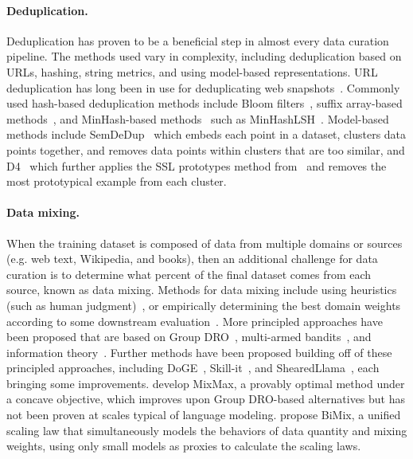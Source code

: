 \documentclass{article}
\begin{document}
\paragraph{Deduplication.}
Deduplication has proven to be a beneficial step in almost every data curation pipeline. The methods used vary in complexity, including deduplication based on URLs, hashing, string metrics, and using model-based representations. URL deduplication has long been in use for deduplicating web snapshots~\citep{10.1145/1645953.1646283}. Commonly used hash-based deduplication methods include Bloom filters~\citep{10.1145/362686.362692, soldaini2024dolma}, suffix array-based methods~\citep{Lee2021DeduplicatingTD, refinedweb}, and MinHash-based methods~\citep{666900} such as MinHashLSH~\citep{gpt3}. Model-based methods include SemDeDup~\citep{abbas2023semdedup} which embeds each point in a dataset, clusters data points together, and removes data points within clusters that are too similar, and D4~\citep{tirumala2024d4} which further applies the SSL prototypes method from~\citet{sorscher2022beyond} and removes the most prototypical example from each cluster.

\paragraph{Data mixing.}
When the training dataset is composed of data from multiple domains or sources (e.g. web text, Wikipedia, and books), then an additional challenge for data curation is to determine what percent of the final dataset comes from each source, known as data mixing. Methods for data mixing include using heuristics (such as human judgment)~\citep{pile, llama}, or empirically determining the best domain weights according to some downstream evaluation~\citep{du2022glam, gopher}. More principled approaches have been proposed that are based on Group DRO~\citep{xie2023doremi}, multi-armed bandits~\citep{albalak2023improving}, and information theory~\citep{albalak2023efficient}. Further methods have been proposed building off of these principled approaches, including DoGE~\citep{fan2023doge}, Skill-it~\citep{chen2023skillit}, and ShearedLlama~\citep{xia2023sheared}, each bringing some improvements. \citet{thudi2024finding} develop MixMax, a provably optimal method under a concave objective, which improves upon Group DRO-based alternatives but has not been proven at scales typical of language modeling. \citet{ge2024data} propose BiMix, a unified scaling law that simultaneously models the behaviors of data quantity and mixing weights, using only small models as proxies to calculate the scaling laws.
\end{document}
